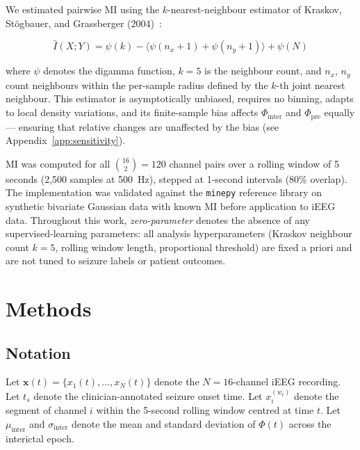\documentclass[final,5p,times,twocolumn]{elsarticle}
\begin{document}
We estimated pairwise MI using the $k$-nearest-neighbour estimator of
Kraskov, St\"{o}gbauer, and Grassberger (2004)~\cite{kraskov2004}:

\begin{equation}
  \hat{I}(X; Y)
    = \psi(k)
      - \bigl\langle \psi(n_x + 1) + \psi(n_y + 1) \bigr\rangle
      + \psi(N)
  \label{eq:kraskov}
\end{equation}

\noindent
where $\psi$ denotes the digamma function, $k = 5$ is the neighbour
count, and $n_x$, $n_y$ count neighbours within the per-sample radius
defined by the $k$-th joint nearest neighbour.
%
This estimator is asymptotically unbiased, requires no binning, adapts
to local density variations, and its finite-sample bias affects
$\Phi_{\text{inter}}$ and $\Phi_{\text{pre}}$ equally --- ensuring that
relative changes are unaffected by the bias (see
Appendix~\ref{app:sensitivity}).

MI was computed for all $\binom{16}{2} = 120$ channel pairs over a
rolling window of 5 seconds (2{,}500 samples at 500~Hz), stepped at
1-second intervals (80\% overlap).
%
The implementation was validated against the \texttt{minepy} reference
library on synthetic bivariate Gaussian data with known MI before
application to iEEG data.
%
Throughout this work, \textit{zero-parameter} denotes the absence of
any supervised-learning parameters: all analysis hyperparameters
(Kraskov neighbour count $k = 5$, rolling window length, proportional
threshold) are fixed a priori and are not tuned to seizure labels or
patient outcomes.

\section{Methods}
\label{sec:methods}

\subsection{Notation}

Let $\mathbf{x}(t) = \{x_1(t), \ldots, x_N(t)\}$ denote the
$N = 16$-channel iEEG recording.
%
Let $t_s$ denote the clinician-annotated seizure onset time.
%
Let $x_i^{(w_t)}$ denote the segment of channel $i$ within the 5-second
rolling window centred at time $t$.
%
Let $\mu_{\text{inter}}$ and $\sigma_{\text{inter}}$ denote the mean
and standard deviation of $\Phi(t)$ across the interictal epoch.
\end{document}
